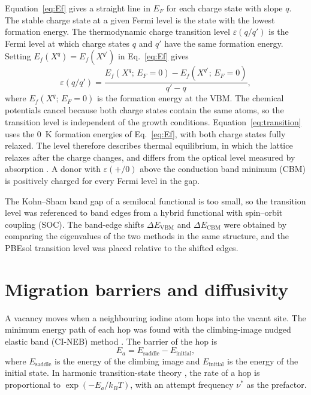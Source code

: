 Equation~\ref{eq:Ef} gives a straight line in $E_F$ for each charge state with slope $q$. The stable charge state at a given Fermi level is the state with the lowest formation energy. The thermodynamic charge transition level $\varepsilon(q/q')$ is the Fermi level at which charge states $q$ and $q'$ have the same formation energy. Setting $E_f(X^q) = E_f(X^{q'})$ in Eq.~\ref{eq:Ef} gives
\begin{equation}
  \varepsilon(q/q') = \frac{E_f(X^q;\,E_F = 0) - E_f(X^{q'};\,E_F = 0)}{q' - q} ,
  \label{eq:transition}
\end{equation}
where $E_f(X^q;\,E_F = 0)$ is the formation energy at the VBM. The chemical potentials cancel because both charge states contain the same atoms, so the transition level is independent of the growth conditions. Equation~\ref{eq:transition} uses the 0~K formation energies of Eq.~\ref{eq:Ef}, with both charge states fully relaxed. The level therefore describes thermal equilibrium, in which the lattice relaxes after the charge changes, and differs from the optical level measured by absorption \citep{Freysoldt2014}. A donor with $\varepsilon(+/0)$ above the conduction band minimum (CBM) is positively charged for every Fermi level in the gap.

The Kohn--Sham band gap of a semilocal functional is too small, so the transition level was referenced to band edges from a hybrid functional with spin--orbit coupling (SOC). The band-edge shifts $\Delta E_\mathrm{VBM}$ and $\Delta E_\mathrm{CBM}$ were obtained by comparing the eigenvalues of the two methods in the same structure, and the PBEsol transition level was placed relative to the shifted edges.

\section{Migration barriers and diffusivity}
\label{sec:migration-theory}

A vacancy moves when a neighbouring iodine atom hops into the vacant site. The minimum energy path of each hop was found with the climbing-image nudged elastic band (CI-NEB) method \citep{Henkelman2000}. The barrier of the hop is
\begin{equation*}
  E_a = E_\mathrm{saddle} - E_\mathrm{initial} ,
\end{equation*}
where $E_\mathrm{saddle}$ is the energy of the climbing image and $E_\mathrm{initial}$ is the energy of the initial state. In harmonic transition-state theory \citep{Vineyard1957}, the rate of a hop is proportional to $\exp(-E_a/k_BT)$, with an attempt frequency $\nu^{*}$ as the prefactor.

